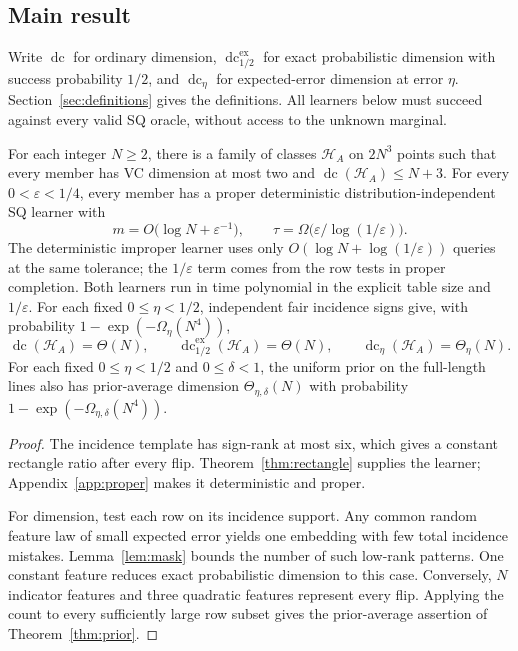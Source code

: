 \documentclass[11pt,letterpaper,pmlr,twoside]{jmlr}
\newcommand{\Hc}{\mathcal H}
\newcommand{\eps}{\varepsilon}
\newcommand{\dc}{\operatorname{dc}}
\newcommand{\edc}{\operatorname{dc}^{\mathrm{ex}}_{1/2}}
\newenvironment{proofsketch}{%
  \renewcommand{\proofname}{Proof sketch}%
  \begin{proof}%
}{\end{proof}}
\begin{document}
\subsection{Main result}\label{sec:main}
Write $\dc$ for ordinary dimension, $\edc$ for exact probabilistic dimension with success probability $1/2$, and $\dc_\eta$ for expected-error dimension at error $\eta$. Section~\ref{sec:definitions} gives the definitions. All learners below must succeed against every valid SQ oracle, without access to the unknown marginal.

\begin{theorem}\label{thm:main}
For each integer $N\ge2$, there is a family of classes $\Hc_A$ on $2N^3$ points such that every member has VC dimension at most two and $\dc(\Hc_A)\le N+3$. For every $0<\eps<1/4$, every member has a proper deterministic distribution-independent SQ learner with
\begin{equation}
 m=O\bigl(\log N+\eps^{-1}\bigr),
 \qquad \tau=\Omega\bigl(\eps/\log(1/\eps)\bigr).
 \label{eq:mainlearn}
\end{equation}
The deterministic improper learner uses only $O(\log N+\log(1/\eps))$ queries at the same tolerance; the $1/\eps$ term comes from the row tests in proper completion. Both learners run in time polynomial in the explicit table size and $1/\eps$. For each fixed $0\le\eta<1/2$, independent fair incidence signs give, with probability $1-\exp(-\Omega_\eta(N^4))$,
\begin{equation}
 \dc(\Hc_A)=\Theta(N),\qquad
 \edc(\Hc_A)=\Theta(N),\qquad
 \dc_\eta(\Hc_A)=\Theta_\eta(N).
 \label{eq:maindim}
\end{equation}
For each fixed $0\le\eta<1/2$ and $0\le\delta<1$, the uniform prior on the full-length lines also has prior-average dimension $\Theta_{\eta,\delta}(N)$ with probability $1-\exp(-\Omega_{\eta,\delta}(N^4))$.
\end{theorem}

\begin{proofsketch}
The incidence template has sign-rank at most six, which gives a constant rectangle ratio after every flip. Theorem~\ref{thm:rectangle} supplies the learner; Appendix~\ref{app:proper} makes it deterministic and proper.

For dimension, test each row on its incidence support. Any common random feature law of small expected error yields one embedding with few total incidence mistakes. Lemma~\ref{lem:mask} bounds the number of such low-rank patterns. One constant feature reduces exact probabilistic dimension to this case. Conversely, $N$ indicator features and three quadratic features represent every flip. Applying the count to every sufficiently large row subset gives the prior-average assertion of Theorem~\ref{thm:prior}.
\end{proofsketch}
\end{document}
